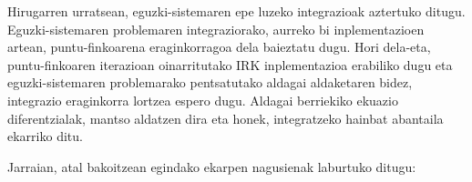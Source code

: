 
Hirugarren urratsean, eguzki-sistemaren epe luzeko integrazioak aztertuko ditugu.
Eguzki-sistemaren problemaren integraziorako, aurreko bi inplementazioen artean, puntu-finkoarena eraginkorragoa dela baieztatu dugu. Hori dela-eta, puntu-finkoaren iterazioan oinarritutako IRK inplementazioa erabiliko dugu eta eguzki-sistemaren problemarako pentsatutako aldagai aldaketaren bidez, integrazio eraginkorra lortzea espero dugu. Aldagai berriekiko ekuazio diferentzialak, mantso aldatzen dira eta honek, integratzeko hainbat abantaila ekarriko ditu. 

Jarraian, atal bakoitzean egindako ekarpen nagusienak laburtuko ditugu:

